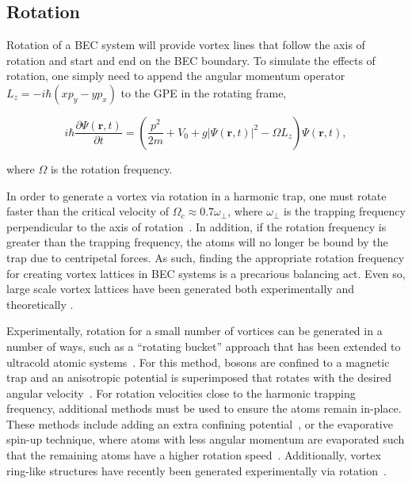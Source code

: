 \subsection{Rotation}

\label{sec:rot}
Rotation of a BEC system will provide vortex lines that follow the axis of rotation and start and end on the BEC boundary.
To simulate the effects of rotation, one simply need to append the angular momentum operator $L_z = -i\hbar(xp_y - yp_x)$ to the GPE in the rotating frame,

\begin{equation}
i \hbar \frac{\partial \Psi(\mathbf{r},t)}{\partial t} = \left(\frac{p^2}{2m} + V_0 + g |\Psi(\mathbf{r},t)|^2 -\Omega L_z \right)\Psi(\mathbf{r},t),
\label{eqn:GPErot}
\end{equation}

\noindent where $\Omega$ is the rotation frequency. 

In order to generate a vortex via rotation in a harmonic trap, one must rotate faster than the critical velocity of $\Omega_c \approx 0.7 \omega_\perp$, where $\omega_\perp$ is the trapping frequency perpendicular to the axis of rotation~\cite{fetter2009}.
In addition, if the rotation frequency is greater than the trapping frequency, the atoms will no longer be bound by the trap due to centripetal forces.
As such, finding the appropriate rotation frequency for creating vortex lattices in BEC systems is a precarious balancing act.
Even so, large scale vortex lattices have been generated both experimentally and theoretically \cite{o2016, o2016topo, abo2001, schweikhard2004}.

Experimentally, rotation for a small number of vortices can be generated in a number of ways, such as a ``rotating bucket'' approach that has been extended to ultracold atomic systems~\cite{chevy2006}.
For this method, bosons are confined to a magnetic trap and an anisotropic potential is superimposed that rotates with the desired angular velocity~\cite{madison2000,abo2001,hodby2001,haljan2001}.
For rotation velocities close to the harmonic trapping frequency, additional methods must be used to ensure the atoms remain in-place.
These methods include adding an extra confining potential~\cite{bretin2004}, or the evaporative spin-up technique, where atoms with less angular momentum are evaporated such that the remaining atoms have a higher rotation speed~\cite{schweikhard2004,engels2003}.
Additionally, vortex ring-like structures have recently been generated experimentally via rotation~\cite{guo2019}.


